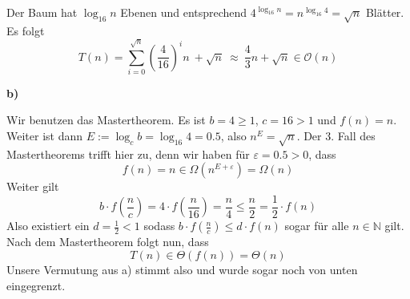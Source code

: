 \documentclass[a4paper,graphics,11pt]{article}
\begin{document}
Der Baum hat $\log_{16}n$ Ebenen und entsprechend $4^{\log_{16}n} = n^{\log_{16}4} = \sqrt{n}$  Blätter.
Es folgt
$$
    T(n) = \sum_{i=0}^{\sqrt{n}} \left(\frac{4}{16}\right)^i n\ + \sqrt{n}\ 
    \approx\ \frac{4}{3}n + \sqrt{n} \in \mathcal{O}(n)
$$

\textbf{b)}

Wir benutzen das Mastertheorem. Es ist $b = 4 \geq 1$, $c = 16 > 1$ und $f(n) = n$.
Weiter ist dann $E := \log_cb = \log_{16} 4 = 0.5$, also $n^E = \sqrt{n}$.
Der 3. Fall des Mastertheorems trifft hier zu, denn wir haben für $\varepsilon = 0.5 > 0$, dass
$$
    f(n) = n \in \Omega(n^{E+\varepsilon}) = \Omega(n)
$$
Weiter gilt
$$
    b\cdot f\left(\frac{n}{c}\right)
    = 4\cdot f\left(\frac{n}{16}\right)
    = \frac{n}{4}
    \leq \frac{n}{2}
    = \frac{1}{2} \cdot f(n)
$$
Also existiert ein $d = \frac{1}{2} < 1$ sodass $b\cdot f(\frac{n}{c}) \leq d\cdot f(n)$ sogar für
alle $n \in \mathbb{N}$ gilt. Nach dem Mastertheorem folgt nun, dass
$$
    T(n) \in \Theta(f(n)) = \Theta(n)
$$
Unsere Vermutung aus a) stimmt also und wurde sogar noch von unten eingegrenzt.
\end{document}
